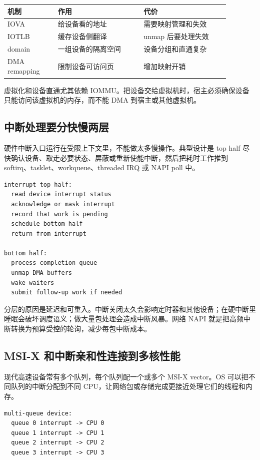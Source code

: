 \begin{longtable}{p{0.2\linewidth}p{0.34\linewidth}p{0.34\linewidth}}
\toprule
机制 & 作用 & 代价 \\
\midrule
IOVA & 给设备看的地址 & 需要映射管理和失效 \\
IOTLB & 缓存设备侧翻译 & unmap 后要处理失效 \\
domain & 一组设备的隔离空间 & 设备分组和直通复杂 \\
DMA remapping & 限制设备可访问页 & 增加映射开销 \\
\bottomrule
\end{longtable}

虚拟化和设备直通尤其依赖 IOMMU。把设备交给虚拟机时，宿主必须确保设备只能访问该虚拟机的内存，而不能 DMA 到宿主或其他虚拟机。

\subsection{中断处理要分快慢两层}

硬件中断入口运行在受限上下文里，不能做太多慢操作。典型设计是 top half 尽快确认设备、取走必要状态、屏蔽或重新使能中断，然后把耗时工作推到 softirq、tasklet、workqueue、threaded IRQ 或 NAPI poll 中。

\begin{lstlisting}
interrupt top half:
  read device interrupt status
  acknowledge or mask interrupt
  record that work is pending
  schedule bottom half
  return from interrupt

bottom half:
  process completion queue
  unmap DMA buffers
  wake waiters
  submit follow-up work if needed
\end{lstlisting}

分层的原因是延迟和可重入。中断关闭太久会影响定时器和其他设备；在硬中断里睡眠会破坏调度语义；做大量包处理会造成中断风暴。网络 NAPI 就是把高频中断转换为预算受控的轮询，减少每包中断成本。

\subsection{MSI-X 和中断亲和性连接到多核性能}

现代高速设备常有多个队列，每个队列配一个或多个 MSI-X vector。OS 可以把不同队列的中断分配到不同 CPU，让网络包或存储完成更接近处理它们的线程和内存。

\begin{lstlisting}
multi-queue device:
  queue 0 interrupt -> CPU 0
  queue 1 interrupt -> CPU 1
  queue 2 interrupt -> CPU 2
  queue 3 interrupt -> CPU 3
\end{lstlisting}


